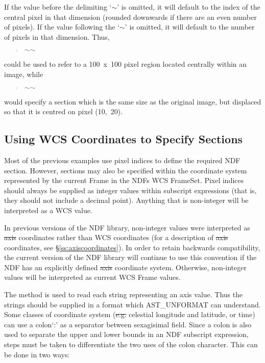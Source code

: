 If the value before the delimiting `$\sim$' is omitted, it will default to the
index of the central pixel in that dimension (rounded downwards if there are an
even number of pixels). If the value following the `$\sim$' is omitted, it will
default to the number of pixels in that dimension. Thus,

\small
\begin{quote}
\begin{center}
$\sim$$\sim$
\end{center}
\end{quote}
\normalsize

could be used to refer to a 100~x~100 pixel region located centrally within an
image, while

\small
\begin{quote}
\begin{center}
$\sim$$\sim$ \hi{)}
\end{center}
\end{quote}
\normalsize

would specify a section which is the same size as the original image, but
displaced so that it is centred on pixel (10,~20).

\subsection{\label{ss:axissections}Using
WCS Coordinates to Specify Sections}

Most of the previous examples use pixel indices to define the required
NDF section. However, sections may also be specified within the coordinate 
system represented by the current Frame in the NDFs WCS FrameSet. Pixel
indices should always be supplied as integer values within subscript 
expressions (that is, they should not include a decimal point). Anything 
that is non-integer will be interpreted as a WCS value.

In previous versions of the NDF library, non-integer values were interpreted 
as \st{axis\/} coordinates rather than WCS coordinates (for a description of 
\st{axis\/} coordinates, see \S\ref{ss:axiscoordinates}). In order to
retain backwards compatibility, the current version of the NDF library
will continue to use this convention if the NDF has an explicitly 
defined \st{axis\/} coordinate system. Otherwise, non-integer values will
be interpreted as  current WCS Frame values.

The  method is used to read each
string representing an axis value. Thus the strings should be supplied in
a format which AST\_UNFORMAT can understand. Some classes of coordinate
system (\st{e.g.\/} celestial longitude and latitude, or time) can use a
colon`:' as a separator between sexagisimal field. Since a colon is also
used to separate the upper and lower bounds in an NDF subscript expression,
steps must be taken to differentiate the two uses of the colon character. 
This can be done in two ways:

